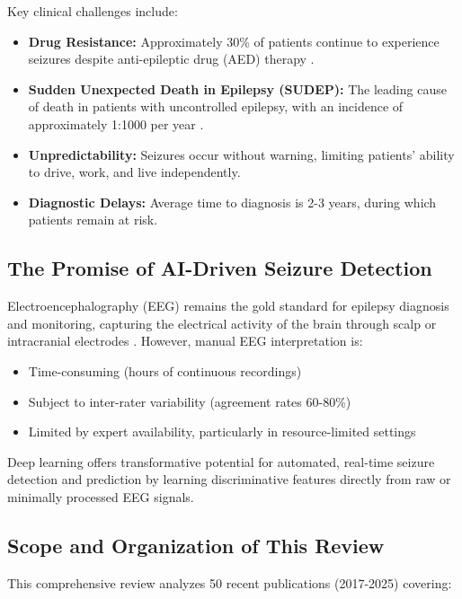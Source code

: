 \documentclass[12pt,a4paper]{article}
\begin{document}
Key clinical challenges include:
\begin{itemize}[leftmargin=*]
    \item \textbf{Drug Resistance:} Approximately 30\% of patients continue to experience seizures despite anti-epileptic drug (AED) therapy \citep{kwan2010drug}.
    \item \textbf{Sudden Unexpected Death in Epilepsy (SUDEP):} The leading cause of death in patients with uncontrolled epilepsy, with an incidence of approximately 1:1000 per year \citep{devinsky2016sudep}.
    \item \textbf{Unpredictability:} Seizures occur without warning, limiting patients' ability to drive, work, and live independently.
    \item \textbf{Diagnostic Delays:} Average time to diagnosis is 2-3 years, during which patients remain at risk.
\end{itemize}

\subsection{The Promise of AI-Driven Seizure Detection}

Electroencephalography (EEG) remains the gold standard for epilepsy diagnosis and monitoring, capturing the electrical activity of the brain through scalp or intracranial electrodes \citep{noachtar2009role}. However, manual EEG interpretation is:
\begin{itemize}
    \item Time-consuming (hours of continuous recordings)
    \item Subject to inter-rater variability (agreement rates 60-80\%)
    \item Limited by expert availability, particularly in resource-limited settings
\end{itemize}

Deep learning offers transformative potential for automated, real-time seizure detection and prediction by learning discriminative features directly from raw or minimally processed EEG signals.

\subsection{Scope and Organization of This Review}

This comprehensive review analyzes 50 recent publications (2017-2025) covering:
\end{document}
